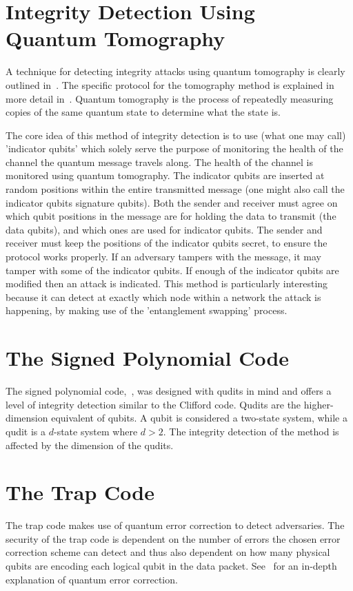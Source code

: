 \section{Integrity Detection Using Quantum Tomography}
\label{subsec:IntegrityDetectionUsingQuantumTomography}
A technique for detecting integrity attacks using quantum tomography is clearly outlined in~\cite{satoh2018network}. The specific protocol for the tomography method is explained in more detail in~\cite{oka2016classical}. Quantum tomography is the process of repeatedly measuring copies of the same quantum state to determine what the state is.

The core idea of this method of integrity detection is to use (what one may call) 'indicator qubits' which solely serve the purpose of monitoring the health of the channel the quantum message travels along. The health of the channel is monitored using quantum tomography. The indicator qubits are inserted at random positions within the entire transmitted message (one might also call the indicator qubits signature qubits). Both the sender and receiver must agree on which qubit positions in the message are for holding the data to transmit (the data qubits), and which ones are used for indicator qubits. The sender and receiver must keep the positions of the indicator qubits secret, to ensure the protocol works properly. If an adversary tampers with the message, it may tamper with some of the indicator qubits. If enough of the indicator qubits are modified then an attack is indicated. This method is particularly interesting because it can detect at exactly which node within a network the attack is happening, by making use of the 'entanglement swapping' process.
\section{The Signed Polynomial Code}
\label{section:signedPolynomialCode}
The signed polynomial code,~\cite{ben2006secure,aharonov2017interactive}, was designed with qudits in mind and offers a level of integrity detection similar to the Clifford code. Qudits are the higher-dimension equivalent of qubits. A qubit is considered a two-state system, while a qudit is a $d$-state system where $d > 2$. The integrity detection of the method is affected by the dimension of the qudits.
\section{The Trap Code}
The trap code makes use of quantum error correction to detect adversaries. The security of the trap code is dependent on the number of errors the chosen error correction scheme can detect and thus also dependent on how many physical qubits are encoding each logical qubit in the data packet. See~\cite{nielsen2002quantum} for an in-depth explanation of quantum error correction.

